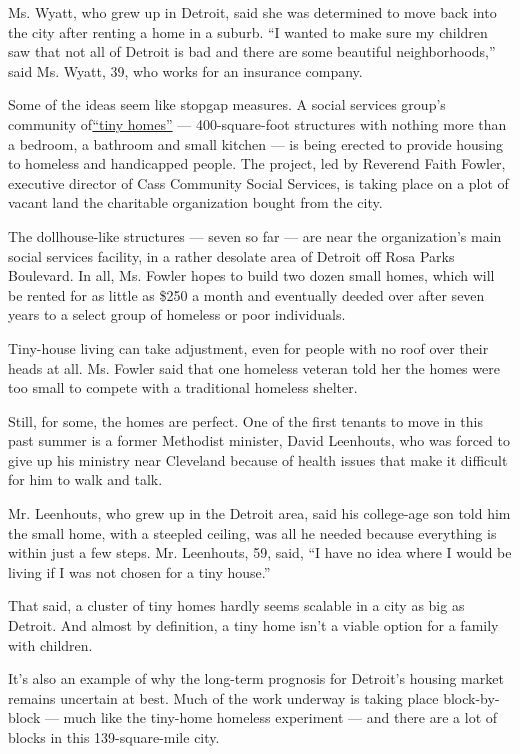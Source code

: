 Ms. Wyatt, who grew up in Detroit, said she was determined to move back
into the city after renting a home in a suburb. ``I wanted to make sure
my children saw that not all of Detroit is bad and there are some
beautiful neighborhoods,'' said Ms. Wyatt, 39, who works for an
insurance company.

Some of the ideas seem like stopgap measures. A social services group's
community of\href{https://casscommunity.org/tinyhomes/}{``tiny homes''}
--- 400-square-foot structures with nothing more than a bedroom, a
bathroom and small kitchen --- is being erected to provide housing to
homeless and handicapped people. The project, led by Reverend Faith
Fowler, executive director of Cass Community Social Services, is taking
place on a plot of vacant land the charitable organization bought from
the city.

The dollhouse-like structures --- seven so far --- are near the
organization's main social services facility, in a rather desolate area
of Detroit off Rosa Parks Boulevard. In all, Ms. Fowler hopes to build
two dozen small homes, which will be rented for as little as \$250 a
month and eventually deeded over after seven years to a select group of
homeless or poor individuals.

Tiny-house living can take adjustment, even for people with no roof over
their heads at all. Ms. Fowler said that one homeless veteran told her
the homes were too small to compete with a traditional homeless shelter.

Still, for some, the homes are perfect. One of the first tenants to move
in this past summer is a former Methodist minister, David Leenhouts, who
was forced to give up his ministry near Cleveland because of health
issues that make it difficult for him to walk and talk.

Mr. Leenhouts, who grew up in the Detroit area, said his college-age son
told him the small home, with a steepled ceiling, was all he needed
because everything is within just a few steps. Mr. Leenhouts, 59, said,
``I have no idea where I would be living if I was not chosen for a tiny
house.''

That said, a cluster of tiny homes hardly seems scalable in a city as
big as Detroit. And almost by definition, a tiny home isn't a viable
option for a family with children.

It's also an example of why the long-term prognosis for Detroit's
housing market remains uncertain at best. Much of the work underway is
taking place block-by-block --- much like the tiny-home homeless
experiment --- and there are a lot of blocks in this 139-square-mile
city.

